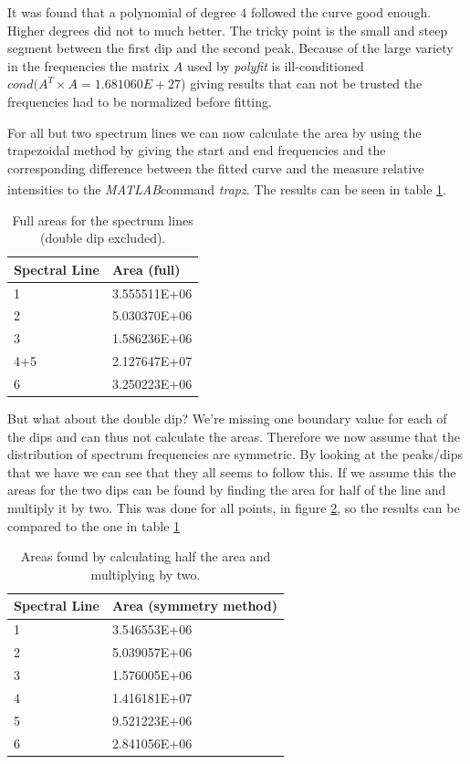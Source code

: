 \documentclass[10pt, a4paper]{article}
\newcommand{\matlab}{\small{\emph{MATLAB\textsuperscript{\textregistered}}}}
\begin{document}
It was found that a polynomial of degree $4$ followed the curve good enough. Higher degrees did not to much better. The tricky point is the small and steep segment between the first dip and the second peak. Because of the large variety in the frequencies the matrix $A$ used by \emph{polyfit} is ill-conditioned $cond(A^T\times A=1.681060E+27$) giving results that can not be trusted the frequencies had to be normalized before fitting.

For all but two spectrum lines we can now calculate the area by using the trapezoidal method by giving the start and end frequencies and the corresponding difference between the fitted curve and the measure relative intensities to the \matlab command \emph{trapz}. The results can be seen in table \ref{table:areas}.

\begin{table}[h]
\begin{center}
\begin{tabular}{l | l}
Spectral Line & Area (full) \\ \hline
1   & 3.555511E+06 \\
2   & 5.030370E+06 \\
3   & 1.586236E+06 \\
4+5 & 2.127647E+07 \\
6   & 3.250223E+06
\end{tabular}
\end{center}
\caption{Full areas for the spectrum lines (double dip excluded).}
\label{table:areas}
\end{table}

But what about the double dip? We're missing one boundary value for each of the dips and can thus not calculate the areas. Therefore we now assume that the distribution of spectrum frequencies are symmetric. By looking at the peaks/dips that we have we can see that they all seems to follow this. If we assume this the areas for the two dips can be found by finding the area for half of the line and multiply it by two. This was done for all points, in figure \ref{table:halfareas}, so the results can be compared to the one in table \ref{table:areas} %

\begin{table}[h]
\begin{center}
\begin{tabular}{l | l}
Spectral Line & Area (symmetry method) \\ \hline
1   & 3.546553E+06 \\
2   & 5.039057E+06 \\
3   & 1.576005E+06 \\
4   & 1.416181E+07 \\
5   & 9.521223E+06 \\
6   & 2.841056E+06
\end{tabular}
\end{center}
\caption{Areas found by calculating half the area and multiplying by two.}
\label{table:halfareas}
\end{table}
 
\end{document}
